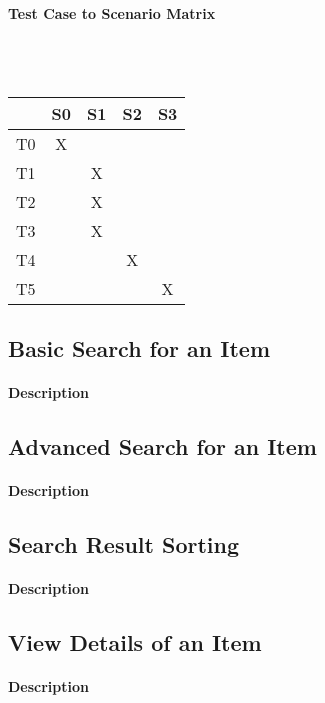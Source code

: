 \documentclass{article}
\begin{document}
\paragraph{Test Case to Scenario Matrix}~\\ \\
\begin{tabular}{ | c || c | c | c | c | }
\hline
    & S0 & S1 & S2 & S3\\
\hline
\hline
T0 & X  &    &    &    \\
\hline
T1 &    & X  &    &    \\
\hline
T2 &    & X  &    &    \\
\hline
T3 &    & X  &    &    \\
\hline
T4 &    &    & X  &    \\
\hline
T5 &    &    &    & X  \\
\hline
\end{tabular}

\subsection{Basic Search for an Item}
\paragraph{Description}


\subsection{Advanced Search for an Item}
\paragraph{Description}


\subsection{Search Result Sorting}
\paragraph{Description}


\subsection{View Details of an Item}
\paragraph{Description}
\end{document}
